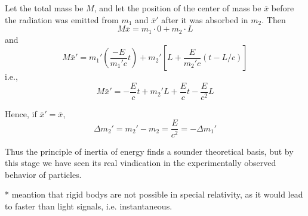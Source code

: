 Let the total mass be $M$, and let the position of the center of mass be $\bar{x}$ before the radiation was emitted from $m_1$ and $\bar{x}'$ after it was absorbed in $m_2$. Then
\begin{equation}
    M\bar{x} = m_1 \cdot 0 + m_2 \cdot L \tag{1-32}
\end{equation}
and
\[
M\bar{x}' = m_1'\left( \frac{-E}{m_1' c} t \right) + m_2' \left[ L + \frac{E}{m_2' c} (t - L/c) \right]
\]
i.e.,
\begin{equation}
    M\bar{x}' = - \frac{E}{c} t + m_2' L + \frac{E}{c} t - \frac{E}{c^2} L \tag{1-33}
\end{equation}

Hence, if $\bar{x}' = \bar{x}$,
\begin{equation}
    \Delta m_2' = m_2' - m_2 = \frac{E}{c^2} = - \Delta m_1' \tag{1-34}
\end{equation}

Thus the principle of inertia of energy finds a sounder theoretical basis, but by this stage we have seen its real vindication in the experimentally observed behavior of particles.



* meantion that rigid bodys are not possible in special relativity, as it would lead to faster than light signals, i.e. instantaneous.







